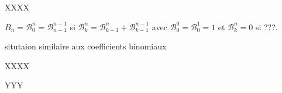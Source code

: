 XXXX

$B_n = \mathcal{B}^n_0 = \mathcal{B}^{n-1}_{n-1}$
si
$\mathcal{B}^n_k = \mathcal{B}^n_{k-1} + \mathcal{B}^{n-1}_{k-1}$
avec
$\mathcal{B}^0_0 = \mathcal{B}^1_0 = 1$
et
$\mathcal{B}^n_k = 0$
si ???.

situtaion similaire aux coefficients binomiaux 


XXXX


%
            {\bellintertree}{}


YYY

